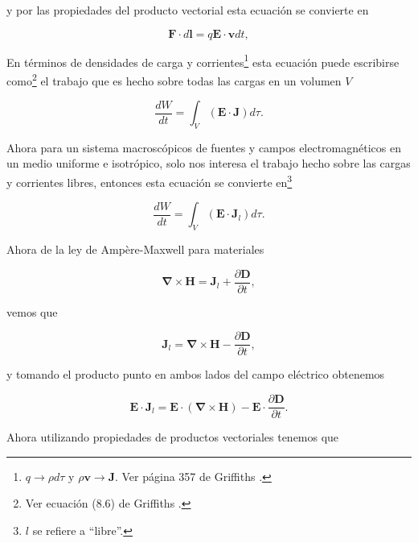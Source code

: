 \documentclass[a4paper,11pt]{article}
\numberwithin{equation}{section}
\begin{document}
y por las propiedades del producto vectorial esta ecuación se convierte en 

\begin{equation}
 \mathbf{F}\cdot d\mathbf{l} = q\mathbf{E}\cdot \mathbf{v}dt,
\end{equation}

En términos de densidades de carga y corrientes\footnote{$q \rightarrow \rho d\tau$ 
y $\rho\mathbf{v} \rightarrow \mathbf{J}$. Ver página 357 de Griffiths \cite{griffiths}.} 
esta ecuación puede escribirse como\footnote{Ver ecuación (8.6) de Griffiths \cite{griffiths}.}
el trabajo que es hecho sobre todas las cargas en un volumen $V$ 

\begin{equation}
 \frac{dW}{dt} = \int_V (\mathbf{E} \cdot \mathbf{J}) d\tau.
\end{equation}

Ahora para un sistema macroscópicos de fuentes y campos electromagnéticos en 
un medio uniforme e isotrópico, solo nos interesa el trabajo hecho sobre las cargas y 
corrientes libres, entonces esta ecuación se convierte en\footnote{$l$ se refiere 
a ``libre''.}

\begin{equation}
 \frac{dW}{dt} = \int_V (\mathbf{E} \cdot \mathbf{J}_l) d\tau.
 \label{eq:trabajoMateriales}
\end{equation}

Ahora de la ley de Ampère-Maxwell para materiales

\begin{equation}
 \pmb{\nabla} \times \mathbf{H} = \mathbf{J}_l + \frac{\partial \mathbf{D}}{\partial t},
\label{eq:amperemaxwell}
\end{equation}

vemos que 

\begin{equation}
 \mathbf{J}_l = \pmb{\nabla} \times \mathbf{H} - \frac{\partial \mathbf{D}}{\partial t},
\end{equation}

y tomando el producto punto en ambos lados del campo eléctrico obtenemos 

\begin{equation}
 \mathbf{E} \cdot \mathbf{J}_l  = \mathbf{E} \cdot (\pmb{\nabla} \times \mathbf{H}) - 
  \mathbf{E} \cdot \frac{\partial \mathbf{D}}{\partial t}.
\end{equation}

Ahora utilizando propiedades de productos vectoriales tenemos que 
\end{document}
